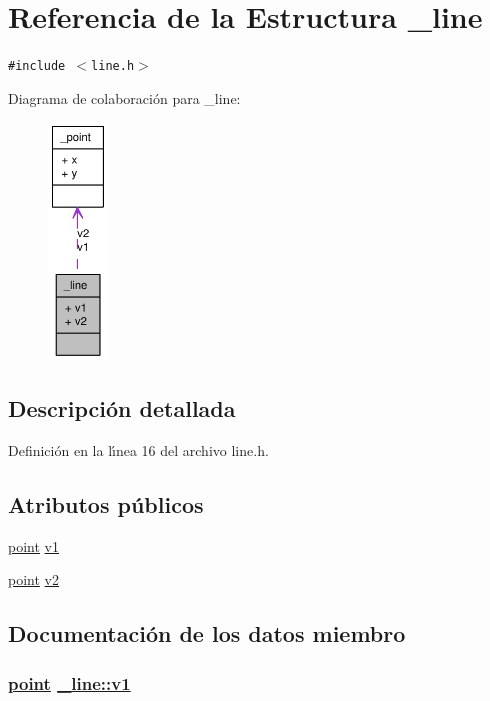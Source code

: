 \hypertarget{struct__line}{
\section{Referencia de la Estructura \_\-line}
\label{struct__line}
}
{\tt \#include $<$line.h$>$}

Diagrama de colaboraci\'{o}n para \_\-line:\begin{figure}[H]
\begin{center}
\leavevmode
\includegraphics[width=44pt]{struct__line__coll__graph}
\end{center}
\end{figure}


\subsection{Descripci\'{o}n detallada}




Definici\'{o}n en la l\'{\i}nea 16 del archivo line.h.\subsection*{Atributos p\'{u}blicos}
\begin{CompactItemize}
\item 
\hyperlink{struct__point}{point} \hyperlink{struct__line_b70e9dced9e0d20c06fa5bdbb1e7be2d_b70e9dced9e0d20c06fa5bdbb1e7be2d}{v1}
\item 
\hyperlink{struct__point}{point} \hyperlink{struct__line_5701d84b34e7ca18c5a246d8f18239c2_5701d84b34e7ca18c5a246d8f18239c2}{v2}
\end{CompactItemize}


\subsection{Documentaci\'{o}n de los datos miembro}
\hypertarget{struct__line_b70e9dced9e0d20c06fa5bdbb1e7be2d_b70e9dced9e0d20c06fa5bdbb1e7be2d}{
\subsubsection[v1]{\setlength{\rightskip}{0pt plus 5cm}\hyperlink{struct__point}{point} \hyperlink{struct__line_b70e9dced9e0d20c06fa5bdbb1e7be2d_b70e9dced9e0d20c06fa5bdbb1e7be2d}{\_\-line::v1}}}
\label{struct__line_b70e9dced9e0d20c06fa5bdbb1e7be2d_b70e9dced9e0d20c06fa5bdbb1e7be2d}




